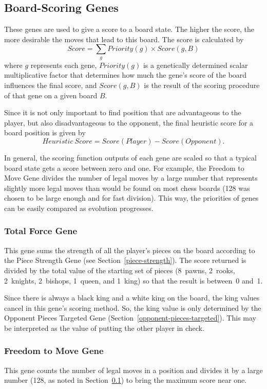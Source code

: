 \documentclass[letterpaper]{article}
\renewcommand{\_}{\allowbreak\textunderscore\allowbreak}
\begin{document}
\subsection{Board-Scoring Genes}\label{board-score-section}

These genes are used to give a score to a board state. The higher the score, the more desirable the moves that lead to this board. The score is calculated by
\[Score = \sum_g Priority(g) \times Score(g,B)\]
where \(g\) represents each gene, \(Priority(g)\) is a genetically determined scalar multiplicative factor that determines how much the gene's score of the board influences the final score, and \(Score(g,B)\) is the result of the scoring procedure of that gene on a given board \(B\).

Since it is not only important to find position that are advantageous to the player, but also disadvantageous to the opponent, the final heuristic score for a board position is given by
\[Heuristic\ Score = Score(Player) - Score(Opponent).\]

In general, the scoring function outputs of each gene are scaled so that a typical board state gets a score between zero and one. For example, the Freedom to Move Gene divides the number of legal moves by a large number that represents slightly more legal moves than would be found on most chess boards (128 was chosen to be large enough and for fast division). This way, the priorities of genes can be easily compared as evolution progresses.

\subsubsection{Total Force Gene}\label{total-force}
This gene sums the strength of all the player's pieces on the board according to the Piece Strength Gene (see Section~\ref{piece-strength}). The score returned is divided by the total value of the starting set of pieces (8~pawns, 2~rooks, 2~knights, 2~bishops, 1~queen, and 1~king) so that the result is between~0 and~1.

Since there is always a black king and a white king on the board, the king values cancel in this gene's scoring method. So, the king value is only determined by the Opponent Pieces Targeted Gene (Section~\ref{opponent-pieces-targeted}). This may be interpreted as the value of putting the other player in check.

\subsubsection{Freedom to Move Gene}
This gene counts the number of legal moves in a position and divides it by a large number (128, as noted in Section~\ref{board-score-section}) to bring the maximum score near one.
\end{document}
